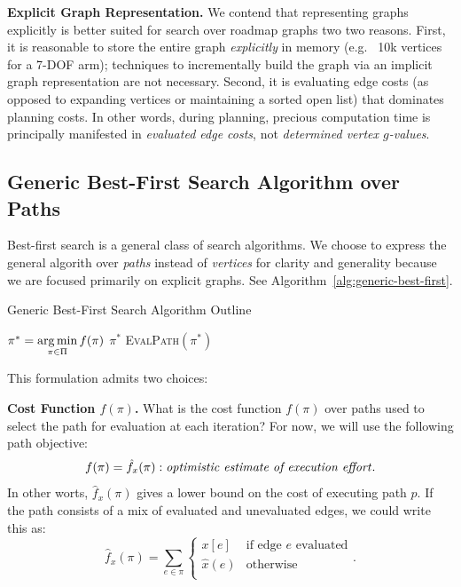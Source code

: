 \textbf{Explicit Graph Representation.}
We contend that representing graphs explicitly
is better suited for search over roadmap graphs
two two reasons.
First, it is reasonable to store the entire graph
\emph{explicitly} in memory
(e.g. ~10k vertices for a 7-DOF arm);
techniques to incrementally build the graph
via an implicit graph representation
are not necessary.
Second,
it is evaluating edge costs
(as opposed to expanding vertices or maintaining
a sorted open list)
that dominates planning costs.
In other words, during planning,
precious computation time is principally manifested in
\emph{evaluated edge costs},
not \emph{determined vertex $g$-values}.

\subsection{Generic Best-First Search Algorithm over Paths}

Best-first search \cite{winston1977ai}
is a general class of search algorithms.
We choose to express the general algorith
over \emph{paths} instead of \emph{vertices}
for clarity and generality
because we are focused primarily on explicit graphs.
See Algorithm~\ref{alg:generic-best-first}.

\begin{algorithm}
   \caption{Generic Best-First Search Algorithm Outline}
   \label{alg:generic-best-first}
   \begin{algorithmic}[1]
   \Loop
      \State $\pi^* = \operatorname*{arg\,min}\limits_{\pi \in \Pi} f(\pi)$
         \label{line:generic-select-optimistic-path}
         \State \Return $\pi^*$
      \EndIf
      \State \textsc{EvalPath}$(\pi^*)$
   \EndLoop
   \EndProcedure
   \end{algorithmic}
\end{algorithm}

This formulation admits two choices:

\textbf{Cost Function $f(\pi)$.}
What is the cost function $f(\pi)$ over paths used to select the
path for evaluation at each iteration?
For now, we will use the following path objective:
\begin{equation}
   f(\pi) = \hat{f}_x(\pi): \mbox{\emph{optimistic estimate of execution effort}}.
\end{equation}
In other worts, $\hat{f}_x(\pi)$
gives a lower bound on the cost of executing
path $p$.
If the path consists of a mix of evaluated and unevaluated edges,
we could write this as:
\begin{equation}
   \hat{f}_x(\pi) = \sum_{e \in \pi} \left\{
   \begin{array}{cl}
      x[e] & \mbox{if edge } e \mbox{ evaluated}  \\
      \hat{x}(e) & \mbox{otherwise} \\
   \end{array}
   \right.
   .
   \label{eqn:execution-cost-objective}
\end{equation}

